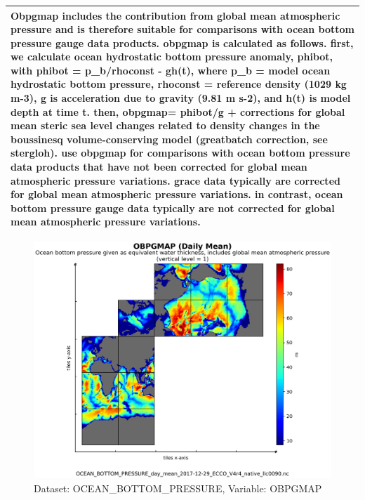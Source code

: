 \begin{longtable}{|m{}|m{}|m{}|m{}|}
\multicolumn{4}{|p{1\textwidth}|}{\footnotesize{{Obpgmap includes the contribution from global mean atmospheric pressure and is therefore suitable for comparisons with ocean bottom pressure gauge data products. obpgmap is calculated as follows. first, we calculate ocean hydrostatic bottom pressure anomaly, phibot, with phibot = p\_b/rhoconst - gh(t), where p\_b = model ocean hydrostatic bottom pressure, rhoconst = reference density (1029 kg m-3), g is acceleration due to gravity (9.81 m s-2), and h(t) is model depth at time t. then, obpgmap= phibot/g + corrections for global mean steric sea level changes related to density changes in the boussinesq volume-conserving model (greatbatch correction, see stergloh). use obpgmap for comparisons with ocean bottom pressure data products that have not been corrected for global mean atmospheric pressure variations. grace data typically are corrected for global mean atmospheric pressure variations. in contrast, ocean bottom pressure gauge data typically are not corrected for global mean atmospheric pressure variations.}}} \\ \hline
\end{longtable}

\begin{figure}[H]
\centering
\includegraphics[scale=0.55]{../images/plots/native_plots/Ocean_Bottom_Pressure/OBPGMAP.png}
\caption{Dataset: OCEAN\_BOTTOM\_PRESSURE, Variable: OBPGMAP}
\label{tab:table-OCEAN_BOTTOM_PRESSURE_OBPGMAP-Plot}
\end{figure}
\newpage
\pagebreak
